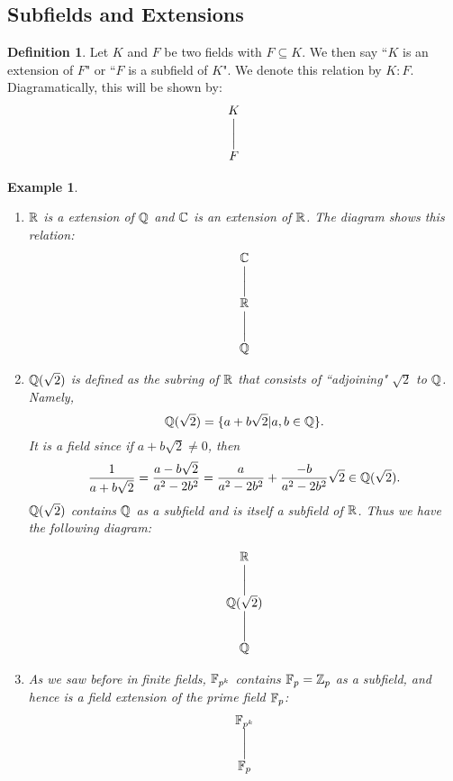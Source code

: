 \documentclass[12pt]{article}
\theoremstyle{plain}
\newtheorem{example}{Example}
\theoremstyle{definition}
\newtheorem{definition}{Definition}
\theoremstyle{remark}
\newcommand{\ext}[1]{%
  \hphantom{\scriptstyle#1}\bigg|{\scriptstyle#1}%
  }
\begin{document}
\subsection{Subfields and Extensions}
\begin{definition}
Let $K$ and $F$ be two fields with $F\subseteq K$. We then say ``$K$ is an extension of $F$" or ``$F$ is a subfield of $K$". We denote this relation by $K:F$.
Diagramatically, this will be shown by:
\[
\begin{array}{@{}c@{}}
K\\
\ext{} \\
F \\
\end{array}
\]

\end{definition}
\begin{example}
\begin{enumerate}
    \item $\mathbb{R}$ is a extension of $\mathbb{Q}$ and $\mathbb{C}$ is an extension of $\mathbb{R}$.
    The diagram shows this relation:
\[
\begin{array}{@{}c@{}}
\mathbb{C}\\
\ext{} \\
\mathbb{R} \\
\ext{} \\
\mathbb{Q}
\end{array}
\]

\item $\mathbb{Q}(\sqrt{2})$ is defined as the subring of $\mathbb{R}$ that consists of ``adjoining" $\sqrt{2}$ to $\mathbb{Q}$. Namely,
$$\mathbb{Q}(\sqrt{2})=\{a+b\sqrt{2}|a,b\in \mathbb{Q}\}.$$
It is a field since if $a+b\sqrt{2}\neq 0$, then
$$\frac{1}{a+b\sqrt{2}} = \frac{a-b\sqrt{2}}{a^2-2b^2} = \frac{a}{a^2-2b^2}+\frac{-b}{a^2-2b^2}\sqrt{2} \in \mathbb{Q}(\sqrt{2}).$$
$\mathbb{Q}(\sqrt{2})$ contains $\mathbb{Q}$ as a subfield and is itself a subfield of $\mathbb{R}$. Thus we have the following diagram:

\[
\begin{array}{@{}c@{}}
\mathbb{R}\\
\ext{} \\
\mathbb{Q}(\sqrt{2}) \\
\ext{} \\
\mathbb{Q}
\end{array}
\]
\item As we saw before in finite fields, $\mathbb{F}_{p^k}$ contains $\mathbb{F}_p=\mathbb{Z}_p$ as a subfield, and hence is a field extension of the prime field $\mathbb{F}_p$:
\[
\begin{array}{@{}c@{}}
\mathbb{F}_{p^k}\\
\ext{} \\
\mathbb{F}_p \\
\end{array}
\]
\end{enumerate}
\end{example}
\end{document}
